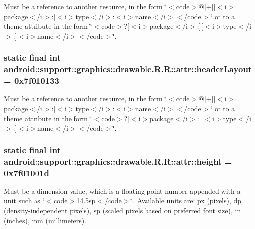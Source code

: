 Must be a reference to another resource, in the form \char`\"{}$<$code$>$@\mbox{[}+\mbox{]}\mbox{[}$<$i$>$package$<$/i$>$:\mbox{]}$<$i$>$type$<$/i$>$:$<$i$>$name$<$/i$>$$<$/code$>$\char`\"{} or to a theme attribute in the form \char`\"{}$<$code$>$?\mbox{[}$<$i$>$package$<$/i$>$:\mbox{]}\mbox{[}$<$i$>$type$<$/i$>$:\mbox{]}$<$i$>$name$<$/i$>$$<$/code$>$\char`\"{}. \hypertarget{classandroid_1_1support_1_1graphics_1_1drawable_1_1_r_1_1attr_d0aea555f6e57a18549ae617e49aab9e}{
\subsubsection[{headerLayout}]{\setlength{\rightskip}{0pt plus 5cm}static final int android::support::graphics::drawable.R.R::attr::headerLayout = 0x7f010133}}
\label{classandroid_1_1support_1_1graphics_1_1drawable_1_1_r_1_1attr_d0aea555f6e57a18549ae617e49aab9e}


Must be a reference to another resource, in the form \char`\"{}$<$code$>$@\mbox{[}+\mbox{]}\mbox{[}$<$i$>$package$<$/i$>$:\mbox{]}$<$i$>$type$<$/i$>$:$<$i$>$name$<$/i$>$$<$/code$>$\char`\"{} or to a theme attribute in the form \char`\"{}$<$code$>$?\mbox{[}$<$i$>$package$<$/i$>$:\mbox{]}\mbox{[}$<$i$>$type$<$/i$>$:\mbox{]}$<$i$>$name$<$/i$>$$<$/code$>$\char`\"{}. \hypertarget{classandroid_1_1support_1_1graphics_1_1drawable_1_1_r_1_1attr_dbe16cb5947f046b1b1842e0710db5e0}{
\subsubsection[{height}]{\setlength{\rightskip}{0pt plus 5cm}static final int android::support::graphics::drawable.R.R::attr::height = 0x7f01001d}}
\label{classandroid_1_1support_1_1graphics_1_1drawable_1_1_r_1_1attr_dbe16cb5947f046b1b1842e0710db5e0}


Must be a dimension value, which is a floating point number appended with a unit such as \char`\"{}$<$code$>$14.5sp$<$/code$>$\char`\"{}. Available units are: px (pixels), dp (density-independent pixels), sp (scaled pixels based on preferred font size), in (inches), mm (millimeters). 

